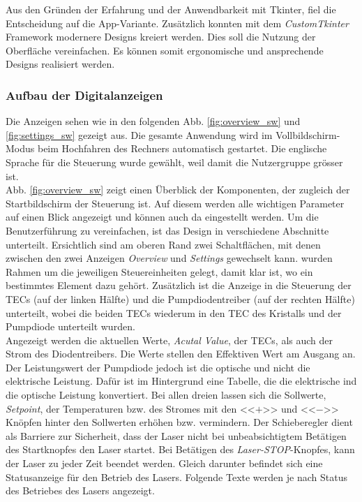 Aus den Gründen der Erfahrung und der Anwendbarkeit mit Tkinter, fiel die Entscheidung auf die App-Variante. Zusätzlich konnten mit dem \textit{CustomTkinter} Framework modernere Designs kreiert werden. Dies soll die Nutzung der Oberfläche vereinfachen. Es können somit ergonomische und ansprechende Designs realisiert werden.

\subsubsection{Aufbau der Digitalanzeigen}
Die Anzeigen sehen wie in den folgenden Abb. \ref{fig:overview_sw} und \ref{fig:settings_sw} gezeigt aus. Die gesamte Anwendung wird im Vollbildschirm-Modus beim Hochfahren des Rechners automatisch gestartet. Die englische Sprache für die Steuerung wurde gewählt, weil damit die Nutzergruppe grösser ist.\\
Abb. \ref{fig:overview_sw} zeigt einen Überblick der Komponenten, der zugleich der Startbildschirm der Steuerung ist. Auf diesem werden alle wichtigen Parameter auf einen Blick angezeigt und können auch da eingestellt werden. Um die Benutzerführung zu vereinfachen, ist das Design in verschiedene Abschnitte unterteilt. Ersichtlich sind am oberen Rand zwei Schaltflächen, mit denen zwischen den zwei Anzeigen \textit{Overview} und \textit{Settings} gewechselt kann.
wurden Rahmen um die jeweiligen Steuereinheiten gelegt, damit klar ist, wo ein bestimmtes Element dazu gehört. Zusätzlich ist die Anzeige in die Steuerung der TECs (auf der linken Hälfte) und die Pumpdiodentreiber (auf der rechten Hälfte) unterteilt, wobei die beiden TECs wiederum in den TEC des Kristalls und der Pumpdiode unterteilt wurden.\\
Angezeigt werden die aktuellen Werte, \textit{Acutal Value}, der TECs, als auch der Strom des Diodentreibers. Die Werte stellen den Effektiven Wert am Ausgang an. Der Leistungswert der Pumpdiode jedoch ist die optische und nicht die elektrische Leistung. Dafür ist im Hintergrund eine Tabelle, die die elektrische ind die optische Leistung konvertiert.
Bei allen dreien lassen sich die Sollwerte, \textit{Setpoint}, der Temperaturen bzw. des Stromes mit den <<$+$>> und <<$-$>> Knöpfen hinter den Sollwerten erhöhen bzw. vermindern.
Der Schieberegler dient als Barriere zur Sicherheit, dass der Laser nicht bei unbeabsichtigtem Betätigen des Startknopfes den Laser startet. Bei Betätigen des \textit{Laser-STOP}-Knopfes, kann der Laser zu jeder Zeit beendet werden. Gleich darunter befindet sich eine Statusanzeige für den Betrieb des Lasers. Folgende Texte werden je nach Status des Betriebes des Lasers angezeigt.


